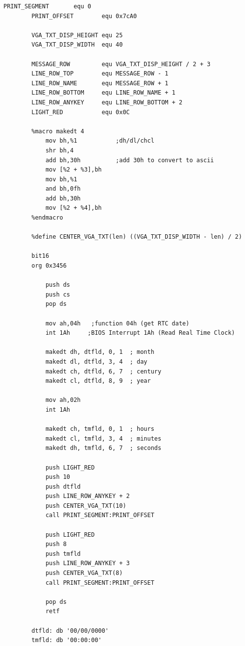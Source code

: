 \documentclass{article}
\begin{document}
    \begin{lstlisting}[caption={datetimeV06.asm listing}, captionpos=t]
        PRINT_SEGMENT       equ 0
        PRINT_OFFSET        equ 0x7cA0

        VGA_TXT_DISP_HEIGHT equ 25
        VGA_TXT_DISP_WIDTH  equ 40

        MESSAGE_ROW         equ VGA_TXT_DISP_HEIGHT / 2 + 3
        LINE_ROW_TOP        equ MESSAGE_ROW - 1
        LINE_ROW_NAME       equ MESSAGE_ROW + 1
        LINE_ROW_BOTTOM     equ LINE_ROW_NAME + 1
        LINE_ROW_ANYKEY     equ LINE_ROW_BOTTOM + 2
        LIGHT_RED           equ 0x0C

        %macro makedt 4
            mov bh,%1 			;dh/dl/chcl
            shr bh,4
            add bh,30h 			;add 30h to convert to ascii
            mov [%2 + %3],bh
            mov bh,%1
            and bh,0fh
            add bh,30h
            mov [%2 + %4],bh
        %endmacro

        %define CENTER_VGA_TXT(len) ((VGA_TXT_DISP_WIDTH - len) / 2)

        bit16
        org 0x3456

            push ds
            push cs
            pop ds

            mov ah,04h	 ;function 04h (get RTC date)
            int 1Ah		;BIOS Interrupt 1Ah (Read Real Time Clock)

            makedt dh, dtfld, 0, 1  ; month
            makedt dl, dtfld, 3, 4  ; day
            makedt ch, dtfld, 6, 7  ; century
            makedt cl, dtfld, 8, 9  ; year

            mov ah,02h
            int 1Ah

            makedt ch, tmfld, 0, 1  ; hours
            makedt cl, tmfld, 3, 4  ; minutes
            makedt dh, tmfld, 6, 7  ; seconds

            push LIGHT_RED
            push 10
            push dtfld
            push LINE_ROW_ANYKEY + 2
            push CENTER_VGA_TXT(10)
            call PRINT_SEGMENT:PRINT_OFFSET

            push LIGHT_RED
            push 8
            push tmfld
            push LINE_ROW_ANYKEY + 3
            push CENTER_VGA_TXT(8)
            call PRINT_SEGMENT:PRINT_OFFSET

            pop ds
            retf

        dtfld: db '00/00/0000'
        tmfld: db '00:00:00'
    \end{lstlisting}
\end{document}
